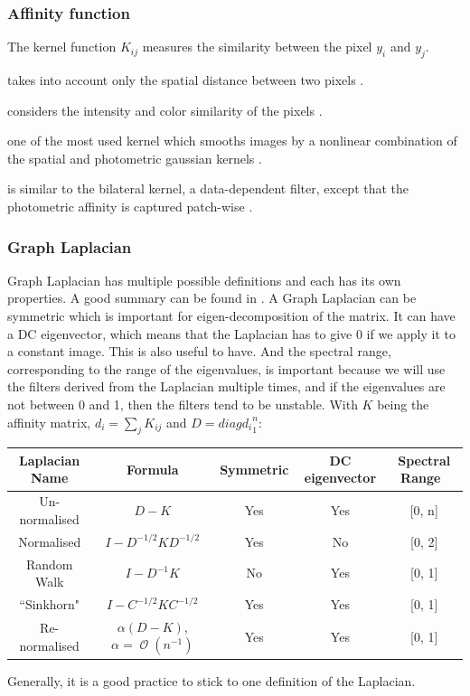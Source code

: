\documentclass[]{article}
\DeclareMathOperator{\bigO}{\mathcal{O}}
\begin{document}
\subsubsection{Affinity function}
The kernel function \(K_{ij}\) measures the similarity between the pixel \(y_i\) and \(y_j\).
\begin{description}[align=left]
 \item [Spatial Gaussian Kernel] takes into account only the spatial distance between two pixels \cite{siam_slides_2016}.
 \item [Photometric Gaussian Kernel] considers the intensity and color similarity of the pixels \cite{siam_slides_2016}.
 \item [Bilateral Kernel] one of the most used kernel which smooths images by a nonlinear combination of the spatial and photometric gaussian kernels \cite{siam_slides_2016} \cite{glide_2014}.
 \item [Non-Local Means (NLM)] is similar to the bilateral kernel, a data-dependent filter, except that the photometric affinity is captured patch-wise \cite{glide_2014}.
\end{description}

\subsubsection{Graph Laplacian}
Graph Laplacian has multiple possible definitions and each has its own properties.
A good summary can be found in \cite{siam_slides_2016}.
A Graph Laplacian can be symmetric which is important for eigen-decomposition of the matrix.
It can have a DC eigenvector, which means that the Laplacian has to give 0 if we apply it to a constant image. This is also useful to have.
And the spectral range, corresponding to the range of the eigenvalues, is important because we will use the filters derived from the Laplacian multiple times, and if the eigenvalues are not between 0 and 1, then the filters tend to be unstable.
With \(K\) being the affinity matrix, \(d_i = \sum_j K_{ij}\) and \(D = diag{d_i}^n_1\):

\begin{table}
 \centering
 \begin{tabular}{|c|c|c|c|c|}
  \hline
  Laplacian Name & Formula & Symmetric & DC eigenvector & Spectral Range \\
  \hline
  Un-normalised & \(D - K\) & Yes & Yes & [0, n] \\
  \hline
  Normalised & \(I - D^{-1/2}KD^{-1/2}\) & Yes & No & [0, 2] \\
  \hline
  Random Walk & \(I - D^{-1}K\) & No & Yes & [0, 1] \\
  \hline
  ``Sinkhorn" \cite{milanfar_symmetrizing_2013} & \(I - C^{-1/2}KC^{-1/2}\) & Yes & Yes & [0, 1] \\
  \hline
  Re-normalised & \(\alpha(D - K)\), \(\alpha = \bigO(n^{-1})\) & Yes & Yes & [0, 1] \\
  \hline
 \end{tabular}
\end{table}

Generally, it is a good practice to stick to one definition of the Laplacian.

\clearpage
\printbibliography
\end{document}
